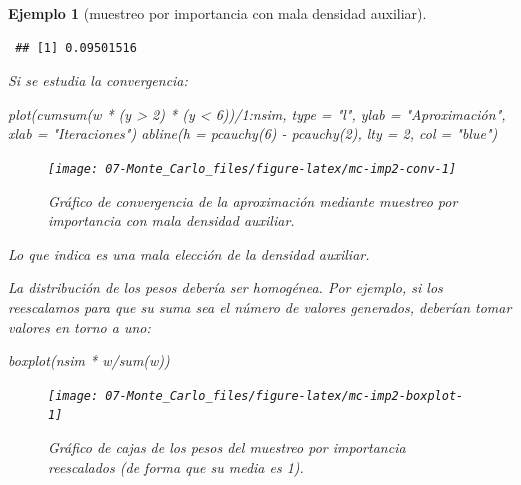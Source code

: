 \documentclass[
]{book}
\newenvironment{Shaded}{\begin{snugshade}}{\end{snugshade}}
\newcommand{\AttributeTok}[1]{\textcolor[rgb]{0.77,0.63,0.00}{#1}}
\newcommand{\DecValTok}[1]{\textcolor[rgb]{0.00,0.00,0.81}{#1}}
\newcommand{\FunctionTok}[1]{\textcolor[rgb]{0.00,0.00,0.00}{#1}}
\newcommand{\NormalTok}[1]{#1}
\newcommand{\SpecialCharTok}[1]{\textcolor[rgb]{0.00,0.00,0.00}{#1}}
\newcommand{\StringTok}[1]{\textcolor[rgb]{0.31,0.60,0.02}{#1}}
\theoremstyle{break}
\newtheorem{example}{Ejemplo}[chapter]
\theoremstyle{nonumberplain}
\begin{document}
\begin{example}[muestreo por importancia con mala densidad auxiliar]
\begin{verbatim}
 ## [1] 0.09501516
\end{verbatim}

Si se estudia la convergencia:

\begin{Shaded}
\begin{Highlighting}[]
\FunctionTok{plot}\NormalTok{(}\FunctionTok{cumsum}\NormalTok{(w }\SpecialCharTok{*}\NormalTok{ (y }\SpecialCharTok{\textgreater{}} \DecValTok{2}\NormalTok{) }\SpecialCharTok{*}\NormalTok{ (y }\SpecialCharTok{\textless{}} \DecValTok{6}\NormalTok{))}\SpecialCharTok{/}\DecValTok{1}\SpecialCharTok{:}\NormalTok{nsim, }\AttributeTok{type =} \StringTok{"l"}\NormalTok{, }\AttributeTok{ylab =} \StringTok{"Aproximación"}\NormalTok{, }\AttributeTok{xlab =} \StringTok{"Iteraciones"}\NormalTok{)}
\FunctionTok{abline}\NormalTok{(}\AttributeTok{h =} \FunctionTok{pcauchy}\NormalTok{(}\DecValTok{6}\NormalTok{) }\SpecialCharTok{{-}} \FunctionTok{pcauchy}\NormalTok{(}\DecValTok{2}\NormalTok{), }\AttributeTok{lty =} \DecValTok{2}\NormalTok{, }\AttributeTok{col =} \StringTok{"blue"}\NormalTok{)}
\end{Highlighting}
\end{Shaded}

\begin{figure}[!htb]

{\centering \texttt{[image: 07-Monte\_Carlo\_files/figure-latex/mc-imp2-conv-1]} 

}

\caption{Gráfico de convergencia de la aproximación mediante muestreo por importancia con mala densidad auxiliar.}\label{fig:mc-imp2-conv}
\end{figure}

Lo que indica es una mala elección de la densidad auxiliar.

La distribución de los pesos debería ser homogénea.
Por ejemplo, si los reescalamos para que su suma sea el número de valores generados, deberían tomar valores en torno a uno:

\begin{Shaded}
\begin{Highlighting}[]
\FunctionTok{boxplot}\NormalTok{(nsim }\SpecialCharTok{*}\NormalTok{ w}\SpecialCharTok{/}\FunctionTok{sum}\NormalTok{(w))  }
\end{Highlighting}
\end{Shaded}

\begin{figure}[!htb]

{\centering \texttt{[image: 07-Monte\_Carlo\_files/figure-latex/mc-imp2-boxplot-1]} 

}

\caption{Gráfico de cajas de los pesos del muestreo por importancia reescalados (de forma que su media es 1).}\label{fig:mc-imp2-boxplot}
\end{figure}

\end{example}
\end{document}
